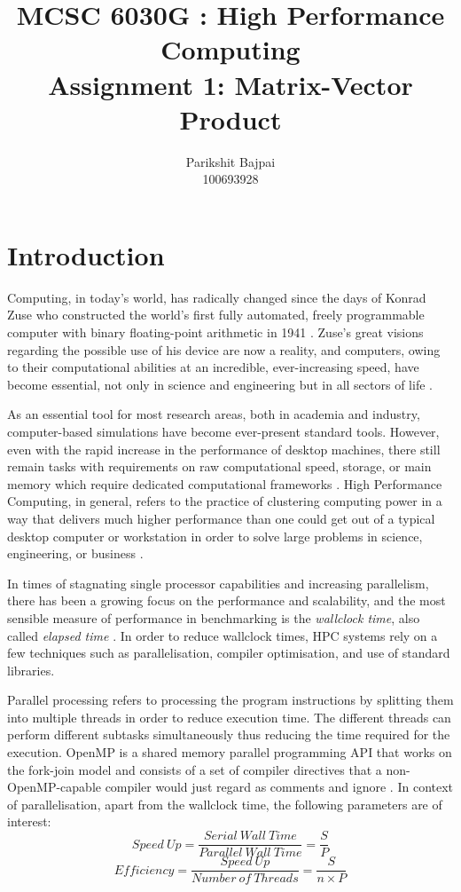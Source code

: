 \documentclass[11pt, oneside]{article}   	%
\title{MCSC 6030G : High Performance Computing \\ Assignment 1: Matrix-Vector Product}
\author{Parikshit Bajpai \\ 100693928}
\date{}							%
\begin{document}
\maketitle

\section{Introduction}
Computing, in today's world, has radically changed since the days of Konrad Zuse who constructed the world's first fully automated, freely   programmable computer with binary floating-point arithmetic in 1941 \cite{Rojas:2002aa}.  Zuse's  great visions regarding the possible use of his device are now a reality, and computers, owing to their computational abilities at an incredible, ever-increasing speed, have become essential, not only in science and engineering but in all sectors of life \cite{Zuse:1993aa}.

As an essential tool for most research areas, both in academia and industry, computer-based simulations have become ever-present standard tools. However, even with the rapid increase in the performance of desktop machines, there still remain tasks with requirements on raw computational speed, storage, or main memory which require dedicated computational frameworks \cite{Hager:2010aa}. High Performance Computing, in general, refers to the practice of clustering computing power in a way that delivers much higher performance than one could get out of a typical desktop computer or workstation in order to solve large problems in science, engineering, or business \cite{insidehpc:aa}.

In times of stagnating single processor capabilities and increasing parallelism, there has been a growing focus on the performance and scalability, and the most sensible measure of performance in benchmarking is the \textit{wallclock time}, also called \textit{elapsed time} \cite{Hager:2010aa}. In order to reduce wallclock times, HPC systems rely on a few techniques such as parallelisation, compiler optimisation, and use of standard libraries.

Parallel processing refers to processing the program instructions by splitting them into multiple threads in order to reduce execution time. The different threads can perform different subtasks simultaneously thus reducing the time required for the execution. OpenMP is a shared memory parallel programming API that works on the fork-join model and consists of a set of compiler directives that a non-OpenMP-capable compiler would just regard as comments and ignore \cite{Board:2015aa}. In context of parallelisation, apart from the wallclock time, the following parameters are of interest:
\begin{equation} \label{Speedup}
Speed \: Up = \frac{Serial \: Wall \: Time}{Parallel \: Wall \: Time} = \frac{S}{P}
\end{equation}
\begin{equation} \label{Efficiency}
Efficiency = \frac{Speed  \: Up}{Number \: of  \: Threads} = \frac{S}{n \times P}
\end{equation}
\end{document}
